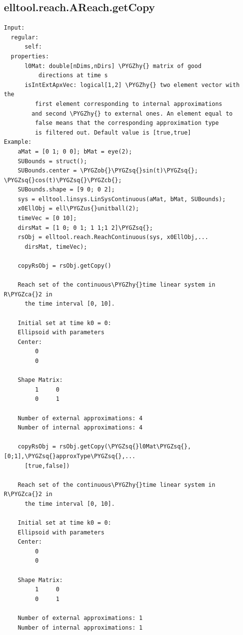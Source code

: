 \documentclass[letterpaper,10pt,english]{sphinxmanual}
\def\PYGZus{\char`\_}
\def\PYGZob{\char`\{}
\def\PYGZcb{\char`\}}
\def\PYGZca{\char`\^}
\def\PYGZhy{\char`\-}
\def\PYGZsq{\char`\'}
\begin{document}
\subsection{elltool.reach.AReach.getCopy}
\label{chap_functions:elltool-reach-areach-getcopy}
\begin{Verbatim}[commandchars=\\\{\}]
Input:
  regular:
      self:
  properties:
      l0Mat: double[nDims,nDirs] \PYGZhy{} matrix of good
          directions at time s
      isIntExtApxVec: logical[1,2] \PYGZhy{} two element vector with the
         first element corresponding to internal approximations
        and second \PYGZhy{} to external ones. An element equal to
         false means that the corresponding approximation type
         is filtered out. Default value is [true,true]
Example:
    aMat = [0 1; 0 0]; bMat = eye(2);
    SUBounds = struct();
    SUBounds.center = \PYGZob{}\PYGZsq{}sin(t)\PYGZsq{}; \PYGZsq{}cos(t)\PYGZsq{}\PYGZcb{};
    SUBounds.shape = [9 0; 0 2];
    sys = elltool.linsys.LinSysContinuous(aMat, bMat, SUBounds);
    x0EllObj = ell\PYGZus{}unitball(2);
    timeVec = [0 10];
    dirsMat = [1 0; 0 1; 1 1;1 2]\PYGZsq{};
    rsObj = elltool.reach.ReachContinuous(sys, x0EllObj,...
      dirsMat, timeVec);

    copyRsObj = rsObj.getCopy()

    Reach set of the continuous\PYGZhy{}time linear system in R\PYGZca{}2 in
      the time interval [0, 10].

    Initial set at time k0 = 0:
    Ellipsoid with parameters
    Center:
         0
         0

    Shape Matrix:
         1     0
         0     1

    Number of external approximations: 4
    Number of internal approximations: 4

    copyRsObj = rsObj.getCopy(\PYGZsq{}l0Mat\PYGZsq{},[0;1],\PYGZsq{}approxType\PYGZsq{},...
      [true,false])

    Reach set of the continuous\PYGZhy{}time linear system in R\PYGZca{}2 in
      the time interval [0, 10].

    Initial set at time k0 = 0:
    Ellipsoid with parameters
    Center:
         0
         0

    Shape Matrix:
         1     0
         0     1

    Number of external approximations: 1
    Number of internal approximations: 1
\end{Verbatim}
\end{document}
